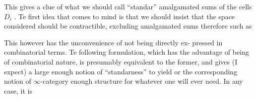 This gives a clue of what we should call ``standar'' amalgamated sums
of the cells $D_i$ . Te first idea that comes to mind is that we should
insist that the space considered should be contractible, excluding
amalgamated sums therefore such as

This  however has the unconvenience of not being directly ex-%
pressed in combinatorial terms. Te following formulation, which has
the advantage of being of combinatorial nature, is presumably equivalent
to the former, and gives  (I expect)  a large enough notion
of ``standarness'' to yield or the corresponding notion of $\infty$-category
enough structure for whatever one will ever need. In any case, it is

